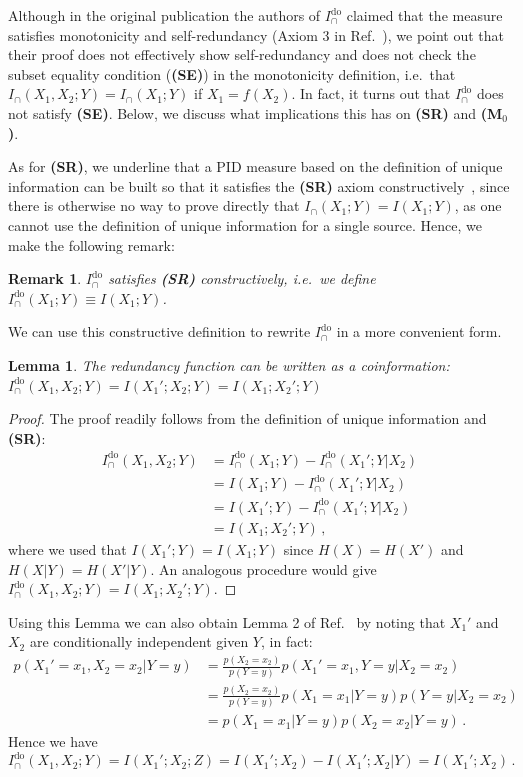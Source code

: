 \documentclass{article}
\newcommand{\ts}[1]{\ensuremath{_{\text{#1}}}}
\newcommand{\Icap}{\ensuremath{I_\cap(X_1,X_2;Y)}}
\newcommand{\SR}{\textbf{(SR)}\xspace} %
\newcommand{\Mz}{\textbf{(M\ts{0})}\xspace} %
\newcommand{\SE}{\textbf{(SE)}\xspace} %
\newcommand{\Ido}{\ensuremath{I_\cap^{\text{do}}}\xspace}
\newcommand{\Idos}{\ensuremath{I_\cap^{\text{do}}(X_1,X_2;Y)}\xspace}
\newtheorem{lemma}{Lemma}
\newtheorem{remark}{Remark}
\begin{document}
Although in the original publication the authors of $\Ido$ claimed that the measure satisfies monotonicity and self-redundancy (Axiom 3 in Ref.~\cite{lyu2024explicit}), we point out that their proof does not effectively show self-redundancy and does not check the subset equality condition (\SE) in the monotonicity definition, i.e.\ that $\Icap=I_\cap(X_1;Y)$ if $X_1=f(X_2)$. In fact, it turns out that $\Ido$ does not satisfy \SE. Below, we discuss what implications this has on \SR and \Mz. 

As for \SR, we underline that a PID measure based on the definition of unique information can be built so that it satisfies the \SR axiom constructively~\cite{james2018unique}, since there is otherwise no way to prove directly that $I_\cap(X_1;Y)=I(X_1;Y)$, as one cannot use the definition of unique information for a single source.
Hence, we make the following remark:
\begin{remark} \label{rem:DO-SR}
    $\Ido$ satisfies \SR constructively, i.e.\ we define $\Ido(X_1;Y)\equiv I(X_1;Y)$.
\end{remark}

We can use this constructive definition to rewrite $\Ido$ in a more convenient form.
\begin{lemma} \label{lemma:DO-Red-CoI}
    The redundancy function can be written as a coinformation: $\Ido(X_1,X_2;Y) = I(X_1';X_2;Y)=I(X_1;X_2';Y)$ 
\end{lemma}
\begin{proof}
    The proof readily follows from the definition of unique information and \SR:
    \begin{equation} \label{eq:DO-CoI}
    \begin{aligned}
        \Ido(X_1,X_2;Y) & = \Ido(X_1;Y) - \Ido(X_1';Y|X_2) \\
        & = I(X_1;Y) - \Ido(X_1';Y|X_2) \\
        & = I(X_1';Y) - \Ido(X_1';Y|X_2) \\
        & =I(X_1;X_2';Y) \,,
    \end{aligned}
    \end{equation}
    where we used that $I(X_1';Y)=I(X_1;Y)$ since $H(X)=H(X')$ and $H(X|Y)=H(X'|Y)$. 
    An analogous procedure would give $\Idos =I(X_1;X_2';Y)$.
\end{proof}
Using this Lemma we can also obtain Lemma 2 of Ref.~\cite{lyu2024explicit} by noting that $X_1'$ and $X_2$ are conditionally independent given $Y$, in fact:
\begin{equation}
    \begin{aligned}
        p(X_1'=x_1,X_2=x_2|Y=y) & = \frac{p(X_2=x_2)}{p(Y=y)} p(X_1'=x_1,Y=y|X_2=x_2) \\
        & = \frac{p(X_2=x_2)}{p(Y=y)} p(X_1=x_1|Y=y) p(Y=y|X_2=x_2) \\
        & = p(X_1=x_1|Y=y) p(X_2=x_2|Y=y) \,.
    \end{aligned}
\end{equation}
Hence we have 
\begin{equation}
    \Idos = I(X_1';X_2;Z) = I(X_1';X_2) - I(X_1';X_2|Y) = I(X_1';X_2) \,.
\end{equation}
\end{document}
